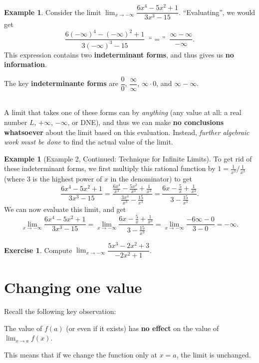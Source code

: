 \documentclass[11pt,reqno,final]{amsart}
\numberwithin{figure}{section}
\theoremstyle{definition} %
\newtheorem{example}[equation]{Example}%
\newtheorem*{example*}{Example}%
\newtheorem{exercise}[question]{Exercise}
\newcommand{\dlim}{\displaystyle\lim}
\begin{document}
\begin{example}
        Consider the limit $\dlim_{x \to -\infty}\dfrac{6x^4-5x^2+1}{3x^3-15}$.
        ``Evaluating'', we would get
        \[                
                \dfrac{6(-\infty)^4 - (-\infty)^2+1}{3(-\infty)^3 - 15}\ \mbox{ `` = '' }\  \dfrac{\infty - \infty}{-\infty}.
        \]
        This expression contains two \textbf{indeterminant forms}, and thus gives us \textbf{no information}.
\end{example}

\begin{framed}
        The key \textbf{indeterminante forms} are $\dfrac{0}{0}$, $\dfrac{\infty}{\infty}$, $\infty \cdot 0$, and $\infty - \infty$.\\\

        A limit that takes one of these forms can by \textit{anything} (any value at all: a real number $L$, $+\infty$, $-\infty$, or DNE), and thus we can make \textbf{no conclusions whatsoever} about the limit based on this evaluation.
        Instead, \textit{further algebraic work must be done} to find the actual value of the limit.        
\end{framed}


\begin{example*}[Example 2, Continued: Technique for Infinite Limits]
        To get rid of these indeterminant forms, we first multiply this rational function by
        $1 = \frac{1}{x^3}/\frac{1}{x^3}$
        (where 3 is the highest power of $x$ in the denominator) to get
        \[
                \dfrac{6x^4-5x^2+1}{3x^3-15}
                = \dfrac{\frac{6x^4}{x^3} - \frac{5x^2}{x^3} + \frac{1}{x^3}}{\frac{3x^3}{x^3} -\frac{15}{x^3}}
                = \dfrac{6x - \frac{5}{x} + \frac{1}{x^3}}{3 - \frac{15}{x^3}}.
        \]
        We can now evaluate this limit, and get
        \[
                \dlim_{x \to -\infty}\dfrac{6x^4-5x^2+1}{3x^3-15}
                = \dlim_{x \to -\infty}\dfrac{6x - \frac{5}{x} + \frac{1}{x^3}}{3 - \frac{15}{x^3}}
                = \dlim_{x \to -\infty}\dfrac{-6\infty - 0}{3-0}
                = -\infty.
        \]
\end{example*}

\newpage

\begin{exercise}
        Compute $\dlim_{x \to -\infty}\dfrac{5x^3-2x^2+3}{-2x^2+1}$.
        \vfill
\end{exercise}

\section{Changing one value}
Recall the following key observation:
\begin{framed}
        The value of $f(a)$ (or even if it exists) has \textbf{no effect} on the value of $\dlim_{x \to a}f(x)$.
\end{framed}
This means that if we change the function only at $x=a$, the limit is unchanged.
\end{document}
